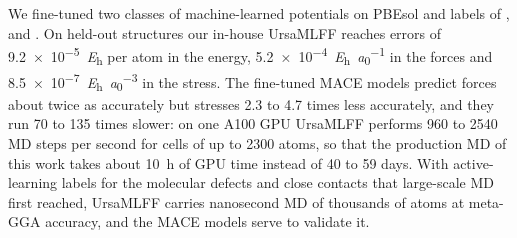 
{\changedcolor
We fine-tuned two classes of machine-learned potentials on PBEsol and \rSCAN{} labels of \CsSnI{}, \MASnI{} and
\FASnI{}. On held-out structures our in-house UrsaMLFF reaches errors of \SI{9.2e-5}{\hartree} per atom in the energy,
\SI{5.2e-4}{\hartree\per\bohr} in the forces and \SI{8.5e-7}{\hartree\per\bohr\cubed} in the stress. The fine-tuned
MACE models predict forces about twice as accurately but stresses 2.3 to 4.7 times less accurately, and they run 70 to
135 times slower: on one A100 GPU UrsaMLFF performs 960 to 2540 MD steps per second for cells of up to 2300 atoms, so
that the production MD of this work takes about \SI{10}{h} of GPU time instead of 40 to 59 days. With active-learning
labels for the molecular defects and close contacts that large-scale MD first reached, UrsaMLFF carries nanosecond MD
of thousands of atoms at meta-GGA accuracy, and the MACE models serve to validate it.

}
